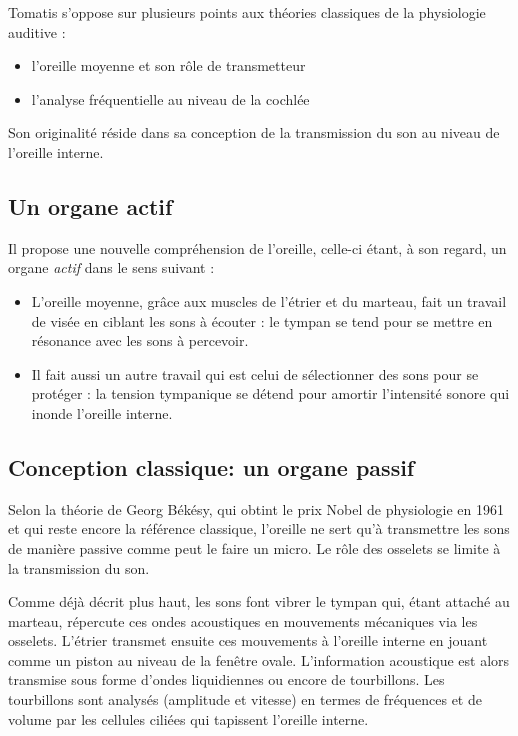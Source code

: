 Tomatis s'oppose sur plusieurs points aux théories classiques de la
physiologie auditive : 
\begin{itemize}
\item l'oreille moyenne et son rôle de transmetteur 
\item l'analyse fréquentielle au niveau de la cochlée
\end{itemize}

Son originalité réside dans sa conception de la transmission du son
au niveau de l'oreille interne. 

\subsection{Un organe actif}

Il propose une nouvelle compréhension de l'oreille, celle-ci étant,
à son regard, un organe \emph{actif}%
 dans le sens suivant :
\begin{itemize}
\item L'oreille moyenne, grâce aux muscles de l'étrier et du marteau, fait
un travail de visée en ciblant les sons à écouter : le tympan se tend
pour se mettre en résonance avec les sons à percevoir.
\item Il fait aussi un autre travail qui est celui de sélectionner des sons
pour se protéger : la tension tympanique se détend pour amortir l'intensité
sonore qui inonde l'oreille interne. 
\end{itemize}

\subsection{Conception classique: un organe passif}

Selon la théorie de Georg Békésy, qui obtint le prix Nobel de
physiologie en 1961 et qui reste encore la référence classique,
l'oreille ne sert qu'à transmettre les sons de manière passive
 comme peut le faire un micro. 
 Le rôle des osselets se limite à la transmission du
son. 

Comme déjà décrit plus haut, les sons font vibrer le tympan qui,
étant attaché au marteau, répercute ces ondes acoustiques en mouvements mécaniques via les osselets. L'étrier transmet ensuite ces mouvements à l'oreille interne en jouant comme un piston au niveau de la fenêtre
ovale. L'information acoustique est alors transmise sous forme d'ondes
liquidiennes ou encore de tourbillons. Les tourbillons sont analysés (amplitude et vitesse) en termes de fréquences et de volume par les
cellules ciliées qui tapissent l'oreille interne.


